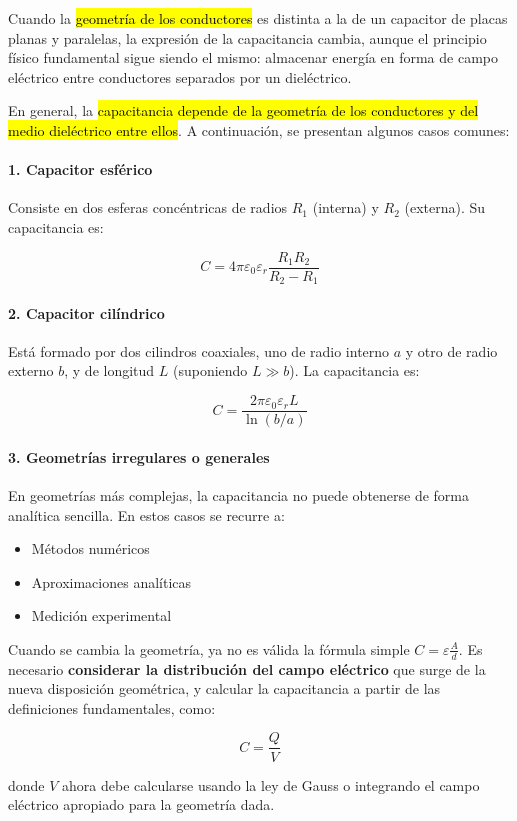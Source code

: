 Cuando la \hl{geometría de los conductores} es distinta a la de un capacitor de placas planas y paralelas, la expresión de la capacitancia cambia, aunque el principio físico fundamental sigue siendo el mismo: almacenar energía en forma de campo eléctrico entre conductores separados por un dieléctrico.

En general, la \hl{capacitancia depende de la geometría de los conductores y del medio dieléctrico entre ellos}. A continuación, se presentan algunos casos comunes:

\paragraph{1. Capacitor esférico}

Consiste en dos esferas concéntricas de radios \( R_1 \) (interna) y \( R_2 \) (externa). Su capacitancia es:

\[
C = 4\pi \varepsilon_0 \varepsilon_r \frac{R_1 R_2}{R_2 - R_1}
\]

\paragraph{2. Capacitor cilíndrico}

Está formado por dos cilindros coaxiales, uno de radio interno \( a \) y otro de radio externo \( b \), y de longitud \( L \) (suponiendo \( L \gg b \)). La capacitancia es:

\[
C = \frac{2\pi \varepsilon_0 \varepsilon_r L}{\ln(b/a)}
\]

\paragraph{3. Geometrías irregulares o generales}

En geometrías más complejas, la capacitancia no puede obtenerse de forma analítica sencilla. En estos casos se recurre a:

\begin{itemize}
    \item Métodos numéricos
    \item Aproximaciones analíticas
    \item Medición experimental
\end{itemize}

Cuando se cambia la geometría, ya no es válida la fórmula simple \( C = \varepsilon \frac{A}{d} \). Es necesario \textbf{considerar la distribución del campo eléctrico} que surge de la nueva disposición geométrica, y calcular la capacitancia a partir de las definiciones fundamentales, como:

\[
C = \frac{Q}{V}
\]

donde \( V \) ahora debe calcularse usando la ley de Gauss o integrando el campo eléctrico apropiado para la geometría dada.